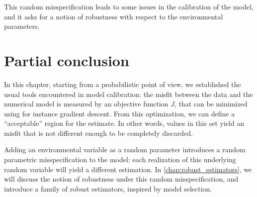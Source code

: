 \documentclass[../../Main_ManuscritThese.tex]{subfiles}
\begin{document}
 This random misspecification leads to some issues in the calibration of the model, and it asks for a notion of robustness with respect to the environmental parameters. 

\section{Partial conclusion}
\label{sec:chap2_partial}

In this chapter, starting from a probabilistic point of view, we established the usual tools encountered in model calibration: the misfit between the data and the numerical model is measured by an objective function $J$, that can be minimized using for instance gradient descent. From this optimization, we can define a ``acceptable'' region for the estimate. In other words, values in this set yield an misfit that is not different enough to be completely discarded.

Adding an environmental variable as a random parameter introduces a random parametric misspecification to the model: each realization of this underlying random variable will yield a different estimation. In \cref{chap:robust_estimators}, we will discuss the notion of robustness under this random misspecification, and introduce a family of robust estimators, inspired by model selection. 




\subfileLocal{
	\pagestyle{empty}
	
	
}
\end{document}
